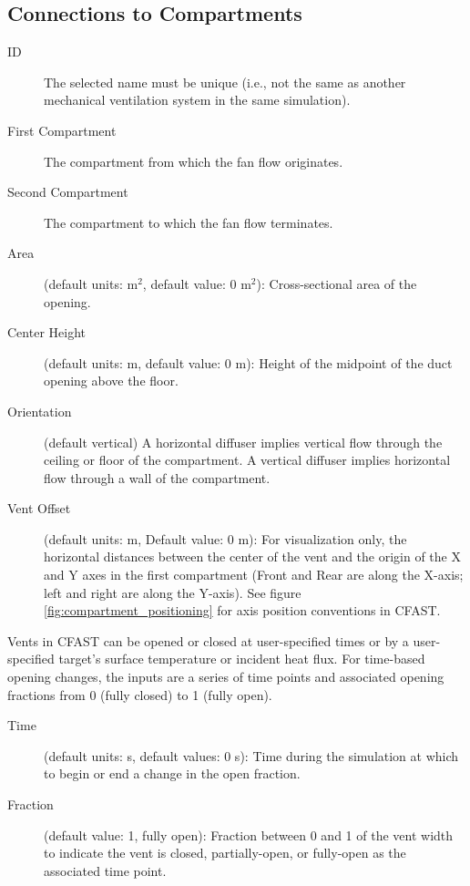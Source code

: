 \subsection{Connections to Compartments}
\label{info:VENT3}
\begin{description}
\item[ID]  The selected name must be unique (i.e., not the same as another mechanical ventilation system in the same simulation).
\item[First Compartment] The compartment from which the fan flow originates.
\item[Second Compartment] The compartment to which the fan flow terminates.
\item[Area] (default units: m$^2$, default value: 0 m$^2$): Cross-sectional area of the opening.
\label{Mech Height}
\item[Center Height] (default units: m, default value: 0 m): Height of the midpoint of the duct opening above the floor.
\item[Orientation] (default vertical) A horizontal diffuser implies vertical flow through the ceiling or floor of the compartment.  A vertical diffuser implies horizontal flow through a wall of the compartment.
\item[Vent Offset] (default units: m, Default value: 0 m): For visualization only, the horizontal distances between the center of the vent and the origin of the X and Y axes in the first compartment (Front and Rear are along the X-axis; left and right are along the Y-axis). See figure \ref{fig:compartment_positioning} for axis position conventions in CFAST.
\end{description}

Vents in CFAST can be opened or closed at user-specified times or by a user-specified target's surface temperature or incident heat flux. For time-based opening changes, the inputs are a series of time points and associated opening fractions from 0 (fully closed) to 1 (fully open).

\begin{description}
\item[Time] (default units: s, default values: 0 s): Time during the simulation at which to begin or end a change in the open fraction.
\item[Fraction] (default value: 1, fully open): Fraction between 0 and 1 of the vent width to indicate the vent is closed, partially-open, or fully-open as the associated time point.
\end{description}

